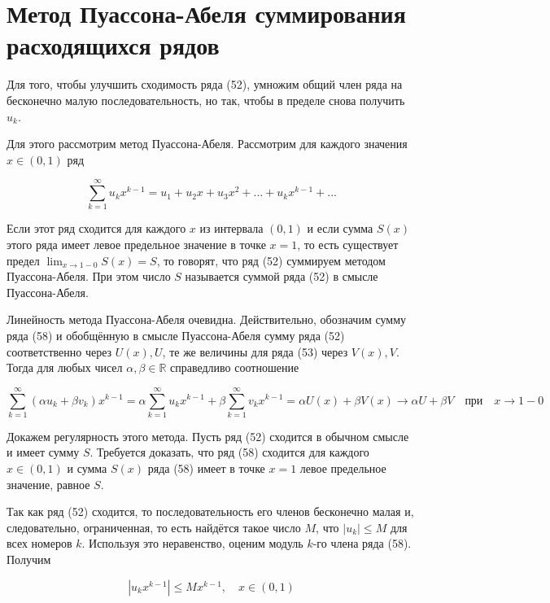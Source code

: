 \section{Метод Пуассона-Абеля суммирования расходящихся рядов}

Для того, чтобы улучшить сходимость ряда (52), умножим общий член ряда на бесконечно малую последовательность, но так, чтобы в пределе снова получить $u_k$.

Для этого рассмотрим метод Пуассона-Абеля. Рассмотрим для каждого значения $x \in (0, 1)$ ряд

\begin{equation}
	\displaystyle\sum_{k = 1}^\infty u_kx^{k - 1} = u_1 + u_2x + u_3x^2 + ... + u_kx^{k - 1} + ...
\end{equation}

Если этот ряд сходится для каждого $x$ из интервала $(0, 1)$ и если сумма $S(x)$ этого ряда имеет левое предельное значение в точке $x = 1$, то есть существует предел $\displaystyle\lim_{x \rightarrow 1 - 0} S(x) = S$, то говорят, что ряд (52) суммируем методом Пуассона-Абеля. При этом число $S$ называется суммой ряда (52) в смысле Пуассона-Абеля.

Линейность метода Пуассона-Абеля очевидна. Действительно, обозначим сумму ряда (58)  и обобщённую в смысле Пуассона-Абеля сумму ряда (52) соответственно через $U(x), U$, те же величины для ряда (53) через $V(x), V$. Тогда для любых чисел $\alpha, \beta \in \mathbb{R}$ справедливо соотношение

\begin{equation*}
	\displaystyle\sum_{k = 1}^\infty (\alpha u_k + \beta v_k)x^{k - 1} = \alpha \displaystyle\sum_{k = 1}^\infty u_k x^{k - 1} + \beta\displaystyle\sum_{k = 1}^\infty v_kx^{k - 1} = \alpha U(x) + \beta V(x) \rightarrow \alpha U + \beta V\quad \mbox{при} \quad x \rightarrow 1 - 0
\end{equation*}

Докажем регулярность этого метода. Пусть ряд (52) сходится в обычном смысле и имеет сумму $S$. Требуется доказать, что ряд (58) сходится для каждого $x \in (0, 1)$ и сумма $S(x)$  ряда (58) имеет в точке $x = 1$ левое предельное значение, равное $S$.

Так как ряд (52) сходится, то последовательность его членов бесконечно малая и, следовательно, ограниченная, то есть найдётся такое число $M$, что $|u_k| \leqslant M$ для всех номеров $k$. Используя это неравенство, оценим модуль $k$-го члена ряда (58). Получим

\begin{equation*}
	|u_k x^{k - 1}| \leqslant Mx^{k - 1},\quad x\in (0, 1)
\end{equation*}

